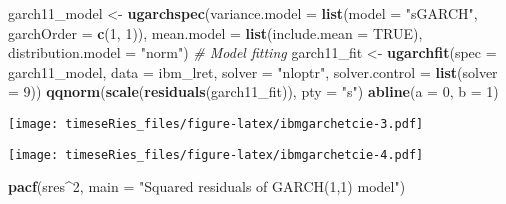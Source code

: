 \documentclass[]{book}
\newenvironment{Shaded}{\begin{snugshade}}{\end{snugshade}}
\newcommand{\CommentTok}[1]{\textcolor[rgb]{0.56,0.35,0.01}{\textit{#1}}}
\newcommand{\DataTypeTok}[1]{\textcolor[rgb]{0.13,0.29,0.53}{#1}}
\newcommand{\DecValTok}[1]{\textcolor[rgb]{0.00,0.00,0.81}{#1}}
\newcommand{\KeywordTok}[1]{\textcolor[rgb]{0.13,0.29,0.53}{\textbf{#1}}}
\newcommand{\NormalTok}[1]{#1}
\newcommand{\OperatorTok}[1]{\textcolor[rgb]{0.81,0.36,0.00}{\textbf{#1}}}
\newcommand{\OtherTok}[1]{\textcolor[rgb]{0.56,0.35,0.01}{#1}}
\newcommand{\StringTok}[1]{\textcolor[rgb]{0.31,0.60,0.02}{#1}}
\begin{document}
\begin{Shaded}
\begin{Highlighting}[]
\NormalTok{garch11_model <-}\StringTok{ }\KeywordTok{ugarchspec}\NormalTok{(}\DataTypeTok{variance.model =} \KeywordTok{list}\NormalTok{(}\DataTypeTok{model =} \StringTok{"sGARCH"}\NormalTok{, }\DataTypeTok{garchOrder =} \KeywordTok{c}\NormalTok{(}\DecValTok{1}\NormalTok{, }
    \DecValTok{1}\NormalTok{)), }\DataTypeTok{mean.model =} \KeywordTok{list}\NormalTok{(}\DataTypeTok{include.mean =} \OtherTok{TRUE}\NormalTok{), }\DataTypeTok{distribution.model =} \StringTok{"norm"}\NormalTok{)}
\CommentTok{# Model fitting}
\NormalTok{garch11_fit <-}\StringTok{ }\KeywordTok{ugarchfit}\NormalTok{(}\DataTypeTok{spec =}\NormalTok{ garch11_model, }\DataTypeTok{data =}\NormalTok{ ibm_lret, }\DataTypeTok{solver =} \StringTok{"nloptr"}\NormalTok{, }
    \DataTypeTok{solver.control =} \KeywordTok{list}\NormalTok{(}\DataTypeTok{solver =} \DecValTok{9}\NormalTok{))}
\KeywordTok{qqnorm}\NormalTok{(}\KeywordTok{scale}\NormalTok{(}\KeywordTok{residuals}\NormalTok{(garch11_fit)), }\DataTypeTok{pty =} \StringTok{"s"}\NormalTok{)}
\KeywordTok{abline}\NormalTok{(}\DataTypeTok{a =} \DecValTok{0}\NormalTok{, }\DataTypeTok{b =} \DecValTok{1}\NormalTok{)}
\end{Highlighting}
\end{Shaded}

\texttt{[image: timeseRies\_files/figure-latex/ibmgarchetcie-3.pdf]}

\begin{Shaded}
\end{Shaded}

\texttt{[image: timeseRies\_files/figure-latex/ibmgarchetcie-4.pdf]}

\begin{Shaded}
\begin{Highlighting}[]
\KeywordTok{pacf}\NormalTok{(sres}\OperatorTok{^}\DecValTok{2}\NormalTok{, }\DataTypeTok{main =} \StringTok{"Squared residuals of GARCH(1,1) model"}\NormalTok{)}
\end{Highlighting}
\end{Shaded}
\end{document}

